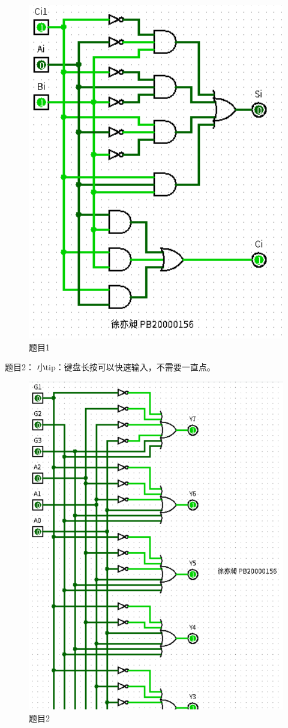 \documentclass[UTF8]{ctexart}
\begin{document}
\begin{figure}[h!]
    \centering
    \includegraphics{p1.PNG}
    \caption{题目1}
\end{figure}
\newpage
题目2：
\newline
小tip：键盘长按可以快速输入，不需要一直点。
\newline
\begin{figure}[h!]
    \centering
    \includegraphics{p2_1.PNG}
    \caption{题目2}
\end{figure}
\end{document}
